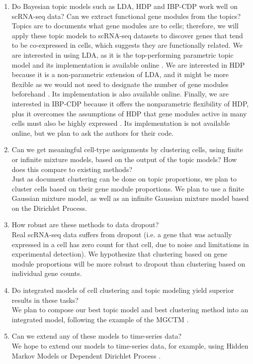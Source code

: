\documentclass[11pt]{article}
\begin{document}
\begin{enumerate}
    \item Do Bayesian topic models such as LDA, HDP and IBP-CDP work well on scRNA-seq data? Can we extract functional gene modules from the topics? \\
    Topics are to documents what gene modules are to cells; therefore, we will apply these topic models to scRNA-seq datasets to discover genes that tend to be co-expressed in cells, which suggests they are functionally related. We are interested in using LDA, as it is the top-performing parametric topic model and its implementation is available online \cite{LDA}. We are interested in HDP because it is a non-parametric extension of LDA, and it might be more flexible as we would not need to designate the number of gene modules beforehand \cite{HDP}. Its implementation is also available online. Finally, we are interested in IBP-CDP because it offers the nonparametric flexibility of HDP, plus it overcomes the assumptions of HDP that gene modules active in many cells must also be highly expressed \cite{IBP}. Its implementation is not available online, but we plan to ask the authors for their code.

    \item Can we get meaningful cell-type assignments by clustering cells, using finite or infinite mixture models, based on the output of the topic models? How does this compare to existing methods?
    \\
    Just as document clustering can be done on topic proportions, we plan to cluster cells based on their gene module proportions. We plan to use a finite Gaussian mixture model, as well as an infinite Gaussian mixture model based on the Dirichlet Process. 

    \item How robust are these methods to data dropout? \\
    Real scRNA-seq data suffers from dropout (i.e. a gene that was actually expressed in a cell has zero count for that cell, due to noise and limitations in experimental detection). We hypothesize that clustering based on gene module proportions will be more robust to dropout than clustering based on individual gene counts.
    
    \item Do integrated models of cell clustering and topic modeling yield superior results in these tasks? \\
    We plan to compose our best topic model and best clustering method into an integrated model, following the example of the MGCTM \cite{pengtao}. 
    \item Can we extend any of these models to time-series data? \\
    We hope to extend our models to time-series data, for example, using Hidden Markov Models or Dependent Dirichlet Process \cite{TS-DDP}.

\end{enumerate}
\end{document}
